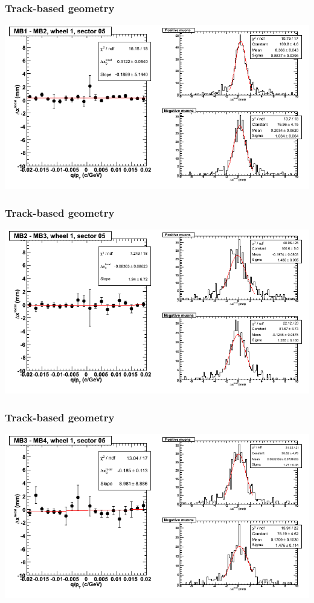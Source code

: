 \documentclass[compress]{beamer}
\begin{document}
\begin{frame}
\frametitle{Track-based geometry}
\includegraphics[width=\linewidth]{NOV4_segdiffs/dt13_resid_D_05_12.png}
\end{frame}

\begin{frame}
\frametitle{Track-based geometry}
\includegraphics[width=\linewidth]{NOV4_segdiffs/dt13_resid_D_05_23.png}
\end{frame}

\begin{frame}
\frametitle{Track-based geometry}
\includegraphics[width=\linewidth]{NOV4_segdiffs/dt13_resid_D_05_34.png}
\end{frame}
\end{document}
